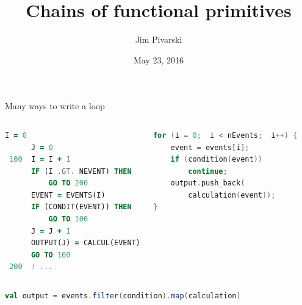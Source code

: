\documentclass{beamer}
\title[2016-05-23-functional-ROOT]{Chains of functional primitives}
\author{Jim Pivarski}
\institute{Princeton University -- DIANA}
\date{May 23, 2016}
\begin{document}

\begin{frame}
  \titlepage
\end{frame}



\begin{frame}[fragile]{Many ways to write a loop}
\begin{columns}
\begin{lstlisting}[language=fortran, basicstyle=\ttfamily\scriptsize, frame=single]
      I = 0
      J = 0
 100  I = I + 1
      IF (I .GT. NEVENT) THEN
          GO TO 200
      EVENT = EVENTS(I)
      IF (CONDIT(EVENT)) THEN
          GO TO 100
      J = J + 1
      OUTPUT(J) = CALCUL(EVENT)
      GO TO 100
 200  ! ...
\end{lstlisting}

\vspace{3 cm}
\begin{lstlisting}[language=c, basicstyle=\ttfamily\scriptsize, frame=single]
for (i = 0;  i < nEvents;  i++) {
    event = events[i];
    if (condition(event))
        continue;
    output.push_back(
        calculation(event));
}
\end{lstlisting}
\end{columns}

\vspace{0.5 cm}

\begin{minipage}[fragile]{0.85\linewidth}
\begin{lstlisting}[language=scala, basicstyle=\ttfamily\scriptsize, frame=single]
val output = events.filter(condition).map(calculation)
\end{lstlisting}
\end{minipage}

\end{frame}
\end{document}
